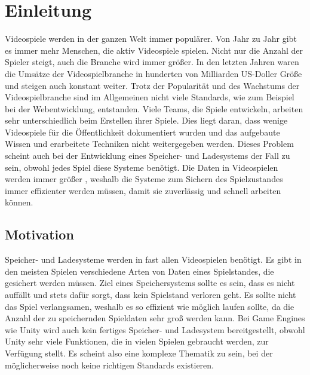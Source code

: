 \chapter{Einleitung}\label{ch:introduction}
Videospiele werden in der ganzen Welt immer populärer. Von Jahr zu Jahr gibt es immer mehr Menschen, die aktiv Videospiele spielen.\cite{explodingtopicsManyGamers} Nicht nur die Anzahl der Spieler steigt, auch die Branche wird immer größer. In den letzten Jahren waren die Umsätze der Videospielbranche in hunderten von Milliarden US-Doller Größe und steigen auch konstant weiter.\cite{statistaUmsatzVideogames} Trotz der Popularität und des Wachstums der Videospielbranche sind im Allgemeinen nicht viele Standards, wie zum Beispiel bei der Webentwicklung, entstanden. Viele Teams, die Spiele entwickeln, arbeiten sehr unterschiedlich beim Erstellen ihrer Spiele. Dies liegt daran, dass wenige Videospiele für die Öffentlichkeit dokumentiert wurden und das aufgebaute Wissen und erarbeitete Techniken nicht weitergegeben werden. Dieses Problem scheint auch bei der Entwicklung eines Speicher- und Ladesystems der Fall zu sein, obwohl jedes Spiel diese Systeme benötigt. Die Daten in Videospielen werden immer größer \cite{ps3blogModernVideo}, weshalb die Systeme zum Sichern des Spielzustandes immer effizienter werden müssen, damit sie zuverlässig und schnell arbeiten können.

\section{Motivation}
Speicher- und Ladesysteme werden in fast allen Videospielen benötigt. Es gibt in den meisten Spielen verschiedene Arten von Daten eines Spielstandes, die gesichert werden müssen. Ziel eines Speichersystems sollte es sein, dass es nicht auffällt und stets dafür sorgt, dass kein Spielstand verloren geht. Es sollte nicht das Spiel verlangsamen, weshalb es so effizient wie möglich laufen sollte, da die Anzahl der zu speichernden Spieldaten sehr groß werden kann. Bei Game Engines wie Unity wird auch kein fertiges Speicher- und Ladesystem bereitgestellt, obwohl Unity sehr viele Funktionen, die in vielen Spielen gebraucht werden, zur Verfügung stellt. Es scheint also eine komplexe Thematik zu sein, bei der möglicherweise noch keine richtigen Standards existieren. 

